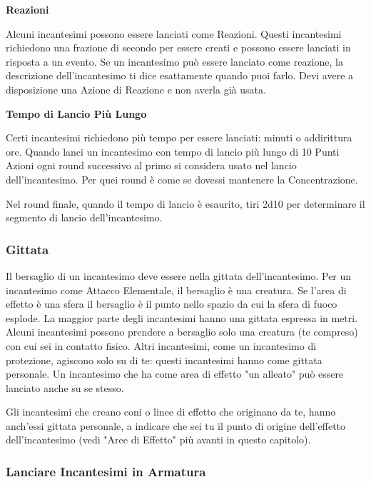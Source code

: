 \documentclass[12pt,a4paper,twoside,openany]{book}
\begin{document}
\begin{multicols}{2}
\textbf{Reazioni}

Alcuni incantesimi possono essere lanciati come Reazioni. Questi incantesimi richiedono una frazione di secondo per essere creati e possono essere lanciati in risposta a un evento. Se un incantesimo può essere lanciato come reazione, la descrizione dell'incantesimo ti dice esattamente quando puoi farlo. Devi avere a disposizione una Azione di Reazione e non averla già usata.

\textbf{Tempo di Lancio Più Lungo}

Certi incantesimi richiedono più tempo per essere lanciati: minuti o addirittura ore. Quando lanci un incantesimo con tempo di lancio più lungo di 10 Punti Azioni ogni round successivo al primo si considera usato nel lancio dell'incantesimo. Per quei round è come se dovessi mantenere la Concentrazione.

Nel round finale, quando il tempo di lancio è esaurito, tiri 2d10 per determinare il segmento di lancio dell'incantesimo.


\subsubsection{Gittata}\label{magiegittata}

Il bersaglio di un incantesimo deve essere nella gittata dell'incantesimo. Per un incantesimo come Attacco Elementale, il bersaglio è una creatura. Se l'area di effetto è una sfera il bersaglio è il punto nello spazio da cui la sfera di fuoco esplode. La maggior parte degli incantesimi hanno una gittata espressa in metri. Alcuni incantesimi possono prendere a bersaglio solo una creatura (te compreso) con cui sei in contatto fisico. Altri incantesimi, come un incantesimo di protezione, agiscono solo su di te: questi incantesimi hanno come gittata personale. Un incantesimo che ha come area di effetto "un alleato" può essere lanciato anche su se stesso.

Gli incantesimi che creano coni o linee di effetto che originano da te, hanno anch'essi gittata personale, a indicare che sei tu il punto di origine dell'effetto dell'incantesimo (vedi "Aree di Effetto" più avanti in questo capitolo).

\subsubsection{Lanciare Incantesimi in Armatura}\label{magielanciareincantesimiinarmatura}


\end{multicols}
\end{document}

